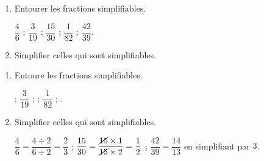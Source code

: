 \begin{exercice*}
    \begin{enumerate}
        \item Entourer les fractions simplifiables.
        
        \smallskip        
        $\dfrac{4}{6}$ ; $\dfrac{3}{19}$ ; $\dfrac{15}{30}$ ; $\dfrac{1}{82}$ ; $\dfrac{42}{39}$.
        \smallskip
        \item Simplifier celles qui sont simplifiables.
    \end{enumerate}
    
\end{exercice*}
\begin{corrige}
    \begin{enumerate}
        \item Entoure les fractions simplifiables.
        
        \smallskip        
         ; $\dfrac{3}{19}$ ;  ; $\dfrac{1}{82}$ ; .
        \smallskip

        \item Simplifier celles qui sont simplifiables.
        
        $\dfrac{4}{6}=\dfrac{4\div 2}{6\div 2}=\dfrac{2}{3}$ ; $\dfrac{15}{30}=\dfrac{\cancel{15}\times 1}{\cancel{15}\times 2}=\dfrac{1}{2}$ ; 
        $\dfrac{42}{39}=\dfrac{14}{13}$ en simplifiant par $3$.
    \end{enumerate}
\end{corrige}

